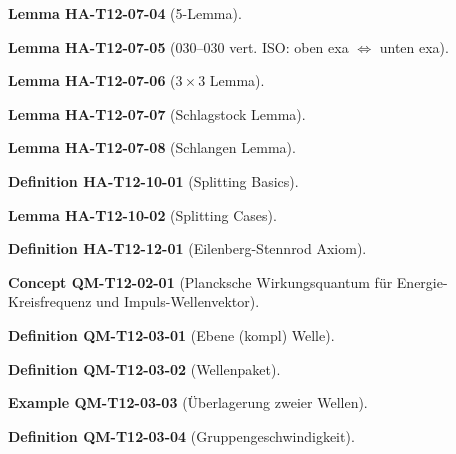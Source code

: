 \documentclass[10pt, letterpaper]{article}
\newcommand{\CustomHeading}[3]{%
  \par\medskip\noindent%
  \textbf{#1 #2} \textnormal{(#3)}.\enskip%
}
\newenvironment{DEF}[2]{\CustomHeading{Definition}{#1}{#2}}{}
\newenvironment{LEM}[2]{\CustomHeading{Lemma}{#1}{#2}}{}
\newenvironment{EXA}[2]{\CustomHeading{Example}{#1}{#2}}{}
\newenvironment{CONC}[2]{\CustomHeading{Concept}{#1}{#2}}{}
\begin{document}
\begin{LEM}{HA-T12-07-04}{5-Lemma}
\end{LEM}

\begin{LEM}{HA-T12-07-05}{$030$–$030$ vert. ISO: oben exa $\Leftrightarrow$ unten exa}
\end{LEM}

\begin{LEM}{HA-T12-07-06}{$3\times 3$ Lemma}
\end{LEM}

\begin{LEM}{HA-T12-07-07}{Schlagstock Lemma}
\end{LEM}

\begin{LEM}{HA-T12-07-08}{Schlangen Lemma}
\end{LEM}

\begin{DEF}{HA-T12-10-01}{Splitting Basics}
\end{DEF}

\begin{LEM}{HA-T12-10-02}{Splitting Cases}
\end{LEM}

\begin{DEF}{HA-T12-12-01}{Eilenberg-Stennrod Axiom}
\end{DEF}

\begin{CONC}{QM-T12-02-01}{Plancksche Wirkungsquantum für Energie-Kreisfrequenz und Impuls-Wellenvektor}
\end{CONC}

\begin{DEF}{QM-T12-03-01}{Ebene (kompl) Welle}
\end{DEF}

\begin{DEF}{QM-T12-03-02}{Wellenpaket}
\end{DEF}

\begin{EXA}{QM-T12-03-03}{Überlagerung zweier Wellen}
\end{EXA}

\begin{DEF}{QM-T12-03-04}{Gruppengeschwindigkeit}
\end{DEF}
\end{document}
